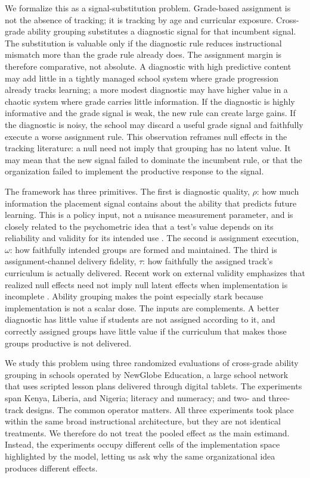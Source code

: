 \documentclass[11pt]{article}
\begin{document}
We formalize this as a signal-substitution problem. Grade-based assignment is not the absence of tracking; it is tracking by age and curricular exposure. Cross-grade ability grouping substitutes a diagnostic signal for that incumbent signal. The substitution is valuable only if the diagnostic rule reduces instructional mismatch more than the grade rule already does. The assignment margin is therefore comparative, not absolute. A diagnostic with high predictive content may add little in a tightly managed school system where grade progression already tracks learning; a more modest diagnostic may have higher value in a chaotic system where grade carries little information. If the diagnostic is highly informative and the grade signal is weak, the new rule can create large gains. If the diagnostic is noisy, the school may discard a useful grade signal and faithfully execute a worse assignment rule. This observation reframes null effects in the tracking literature: a null need not imply that grouping has no latent value. It may mean that the new signal failed to dominate the incumbent rule, or that the organization failed to implement the productive response to the signal.

The framework has three primitives. The first is diagnostic quality, $\rho$: how much information the placement signal contains about the ability that predicts future learning. This is a policy input, not a nuisance measurement parameter, and is closely related to the psychometric idea that a test's value depends on its reliability and validity for its intended use \citep{lordnovick1968,cronbachmeehl1955}. The second is assignment execution, $\omega$: how faithfully intended groups are formed and maintained. The third is assignment-channel delivery fidelity, $\tau$: how faithfully the assigned track's curriculum is actually delivered. Recent work on external validity emphasizes that realized null effects need not imply null latent effects when implementation is incomplete \citep{angristmeager2023}. Ability grouping makes the point especially stark because implementation is not a scalar dose. The inputs are complements. A better diagnostic has little value if students are not assigned according to it, and correctly assigned groups have little value if the curriculum that makes those groups productive is not delivered.

We study this problem using three randomized evaluations of cross-grade ability grouping in schools operated by NewGlobe Education, a large school network that uses scripted lesson plans delivered through digital tablets. The experiments span Kenya, Liberia, and Nigeria; literacy and numeracy; and two- and three-track designs. The common operator matters. All three experiments took place within the same broad instructional architecture, but they are not identical treatments. We therefore do not treat the pooled effect as the main estimand. Instead, the experiments occupy different cells of the implementation space highlighted by the model, letting us ask why the same organizational idea produces different effects.
\end{document}
